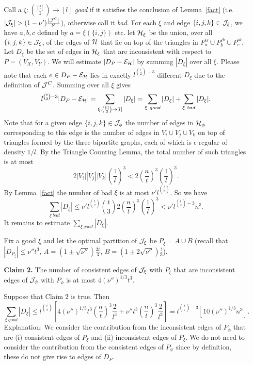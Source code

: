 \documentclass[11pt]{article}
\begin{document}
Call a $\xi: \binom{[t]}{2} \rightarrow [l]$ {\it good} if it satisfies the
conclusion of Lemma~\ref{fact} (i.e. $|\cJ_{\xi}|>(1-\nu')\frac{|\cJ^C|}{l^3}$), otherwise call it {\it bad}. For each $\xi$ and
edge $\{i,j,k\} \in {\cal J}_{\xi}$, we have $a,b,c$ defined by
$a=\xi(\{i,j\})$ etc. let $\mathcal{H}_{\xi}$ be the union, over all
$\{i,j,k\} \in {\cal J}_{\xi}$, of the edges of $\mathcal{H}$ that lie on top of
the triangles in $P_{a}^{ij} \cup P_{b}^{jk} \cup P_{c}^{ik}$.  Let
$D_{\xi}$ be the set of edges in $\mathcal{H}_{\xi}$ that are inconsistent
with respect to $P=(V_X, V_Y)$. We will estimate $|D_P-{\cal E}_{\mathcal{H}}|$
by summing  $|D_{\xi}|$ over all $\xi$.  Please note that each $e\in
D_P-{\cal E}_{\mathcal{H}}$  lies in exactly  $l^{{t \choose 2}-3}$ different
$D_{\xi}$ due to the definition of ${\cal J}^C$. Summing over all $\xi$
gives
$$l^{{t \choose 2}-3} |D_P-{\cal E}_{\mathcal{H}}|
=\sum_{\xi:\binom{[t]}{2} \rightarrow [l]}|D_{\xi}|=\sum_{\xi\  good} |D_{\xi}|
+\sum_{\xi\  bad} |D_{\xi}|.$$ Note that for a given edge $\{i,j,k\}
\in {\cal J}_{\phi}$ the number of edges in $\mathcal{H}_{\phi}$ corresponding to
this edge is the number of edges in $V_i \cup V_j \cup V_k$ on top
of triangles formed by the three bipartite graphs, each of which is
$\epsilon$-regular of density $1/l$.  By the Triangle Counting
Lemma, the total number of such triangles is at most
$$2|V_i||V_j||V_k|\left(\frac1l\right)^3<2\left(\frac{n}{t}\right)^3 \left(\frac1l\right)^3.$$
 By Lemma~\ref{fact} the number of bad $\xi$ is at most $\nu' l^{{t\choose 2}}$.  So we have
$$\sum_{\xi\  bad} |D_{\xi}|\le \nu' l^{{t\choose 2}}
{t \choose 3}2\left(\frac{n}{t}\right)^3
\left(\frac1l\right)^3<\nu'l^{{t\choose 2}-3}n^3.$$ It remains to
estimate $\sum_{\xi\  good} |D_{\xi}|$.

 Fix a good $\xi$ and let the optimal partition of ${\cal J}_{\xi}$ be $P_{\xi}=A \cup B$
 (recall that  $|D_{P_{\xi}}|\le \nu''t^3$, $A=(1 \pm \sqrt{\nu''})\frac{2t}{3}$, $B=(1 \pm 2\sqrt{\nu''})\frac{t}{3}$).

{\bf Claim 2.} The number of consistent edges of ${\cal J}_{\xi}$ with
$P_{\xi}$ that are inconsistent edges of ${\cal J}_{\phi}$ with
$P_{\phi}$ is at most $4(\nu'')^{1/3}t^3$.

Suppose that  Claim 2 is true. Then
$$\sum_{\xi\ good} |D_{\xi}| \le l^{{t\choose 2}}\left[4(\nu'')^{1/3}t^3(\frac{n}{t})^3\frac{2}{l^3}+
\nu''t^3(\frac{n}{t})^3\frac{2}{l^3}\right]= l^{{t\choose
2}-3}\left[10(\nu'')^{1/3}n^3\right].$$ Explanation: We consider the
contribution from the inconsistent edges of $P_{\phi}$ that are (i)
consistent edges of $P_{\xi}$ and (ii) inconsistent edges of
$P_{\xi}$. We do not need to consider the contribution from the
consistent edges of $P_{\phi}$ since by definition, these do not
give rise to edges of $D_P$.
\end{document}
